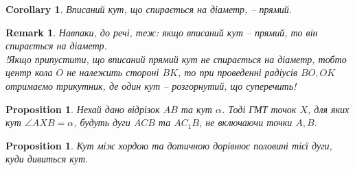 \documentclass[a4paper, 10pt]{article}
\theoremstyle{theoremdd}
\theoremstyle{theoremdd}
\theoremstyle{theoremdd}
\theoremstyle{theoremdd}
\theoremstyle{theoremdd}
\theoremstyle{theoremdd}
\newtheorem{proposition}[theorem]{Proposition}
\theoremstyle{theoremdd}
\newtheorem{remark}[theorem]{Remark}
\theoremstyle{theoremdd}
\theoremstyle{theoremdd}
\newtheorem{corollary}[theorem]{Corollary}
\begin{document}
\begin{corollary}
Вписаний кут, що спирається на діаметр, -- прямий.
\begin{figure}[H]
\centering
{}
\end{figure}
\end{corollary}

\begin{remark}
Навпаки, до речі, теж: якщо вписаний кут -- прямий, то він спирається на діаметр.\\
!Якщо припустити, що вписаний прямий кут не спирається на діаметр, тобто центр кола $O$ не належить стороні $BK$, то при проведенні радіусів $BO,OK$ отримаємо трикутник, де один кут -- розгорнутий, що суперечить!
\end{remark}

\begin{proposition}
Нехай дано відрізок $AB$ та кут $\alpha$. Тоді ГМТ точок $X$, для яких кут $\angle AXB = \alpha$, будуть дуги $ACB$ та $AC_1B$, не включаючи точки $A,B$. 
\end{proposition}

\begin{proposition}
Кут між хордою та дотичною дорівнює половині тієї дуги, куди дивиться кут.
\end{proposition}
\end{document}
